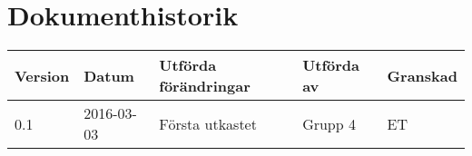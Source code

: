 \documentclass[11pt]{article}
\begin{document}
\tableofcontents

\pagebreak
\section*{Dokumenthistorik}
\begin{table}[h]
\begin{tabular}{|l|l|l|l|l|} \hline

\textbf{Version} & \textbf{Datum} & \textbf{Utförda förändringar} & \textbf{Utförda av} & \textbf{Granskad} \\ \hline
0.1 & 2016-03-03 &  Första utkastet & Grupp 4 & ET \\ \hline
\end{tabular}
\end{table}

\pagebreak
{}
\end{document}
